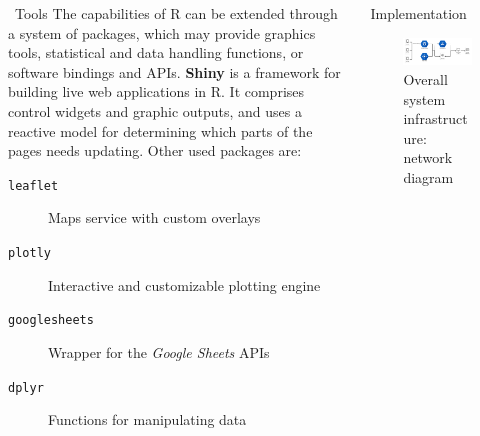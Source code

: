\documentclass[final]{beamer}
\newcommand{\code}[1]{\texttt{#1}}
\newlength{\onecolwid}
\newlength{\twocolwid}
\begin{document}
\begin{frame}[t]
\begin{columns}[t]
\begin{column}{\twocolwid}
\begin{columns}[t, totalwidth=\twocolwid]
\begin{column}{\onecolwid}
\begin{block}{\faWrench \, Tools}
				\vspace{.3in}
				The capabilities of R can be extended through a system of packages, which may provide graphics tools, statistical and data handling functions, or software bindings and APIs.
				\textbf{Shiny} is a framework for building live web applications in R. It comprises control widgets and graphic outputs, and uses a reactive model for determining which parts of the pages needs updating.
				Other used packages are:
				\begin{description}
					\item[\code{leaflet}] Maps service with custom overlays
					\item[\code{plotly}] Interactive and customizable plotting engine
					\item[\code{googlesheets}] Wrapper for the \emph{Google Sheets} APIs
					\item[\code{dplyr}] Functions for manipulating data
				\end{description}
			\end{block}
		\end{column}

		\begin{column}{\onecolwid}\vspace{-.5in}
			\begin{block}{\faCode \, Implementation}

				\begin{figure}
					\includegraphics[width=0.8\onecolwid]{block_dia.png}
					\caption{Overall system infrastructure: network diagram}
				\end{figure}


\end{block}
\end{column}
\end{columns}
\end{column}
\end{columns}
\end{frame}
\end{document}
